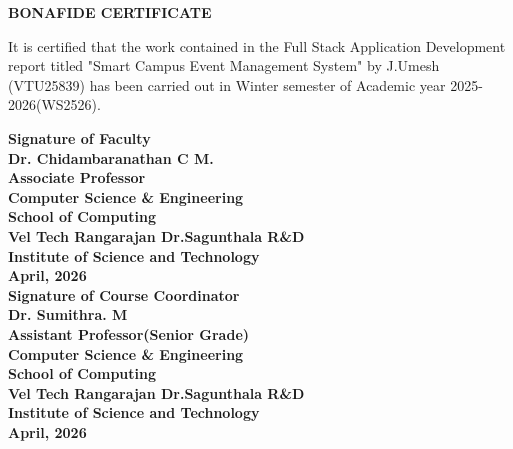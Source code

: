 \documentclass[10pt]{report}
\begin{document}
\newpage 
{} 
\begin{center} 
{\Huge \textbf{ BONAFIDE CERTIFICATE}}\\[0.5cm] 
\end{center} 
\linespread{1.5} 
\large{It is certified that the work contained in the Full Stack Application Development report titled "Smart Campus Event Management System" by J.Umesh (VTU25839) has been carried out in Winter semester of Academic year 2025-2026(WS2526).} 
\vspace{1.5cm} 
\begin{flushright} 
\textbf{Signature of Faculty\\Dr. Chidambaranathan C M.
\\Associate Professor\\Computer Science \& 
Engineering\\School of Computing\\Vel Tech Rangarajan Dr.Sagunthala R\&D\\Institute of Science and Technology\\April, 2026}\\[2.0cm] 
\textbf{Signature of Course Coordinator\\Dr. Sumithra. M\\ Assistant Professor(Senior Grade) \\Computer Science \& Engineering\\School of Computing\\Vel Tech Rangarajan Dr.Sagunthala R\&D\\Institute of Science and Technology\\April, 2026}\\  
\end{flushright} 
 
\end{document}
